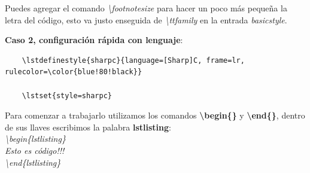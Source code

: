 Puedes agregar el comando \textit{\textbackslash{footnotesize}} para hacer un poco más pequeña la letra del código, esto va justo enseguida de \textit{\textbackslash{ttfamily}} en la entrada \textit{basicstyle}.

\textbf{Caso 2, configuración rápida con lenguaje}:
\begin{lstlisting}
    \lstdefinestyle{sharpc}{language=[Sharp]C, frame=lr, rulecolor=\color{blue!80!black}}
    
    \lstset{style=sharpc}
\end{lstlisting}

Para comenzar a trabajarlo utilizamos los comandos \textbf{\textbackslash{begin\{\}}} y \textbf{\textbackslash{end\{\}}}, dentro de sus llaves escribimos la palabra \textbf{lstlisting}: \\
\textit{
    \textbackslash{begin}\{lstlisting\} \\
    Esto es código!!! \\
    \textbackslash{end}\{lstlisting\}
}